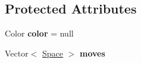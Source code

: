 \subsection*{Protected Attributes}
\begin{DoxyCompactItemize}
\item 
\hypertarget{class_piece_ac3be06c38af4366f18cef94594a30a0d}{Color {\bfseries color} = null}\label{class_piece_ac3be06c38af4366f18cef94594a30a0d}

\item 
\hypertarget{class_piece_a6fb158d95f588f706ae716b13487ba10}{Vector$<$ \hyperlink{class_space}{Space} $>$ {\bfseries moves}}\label{class_piece_a6fb158d95f588f706ae716b13487ba10}

\end{DoxyCompactItemize}


